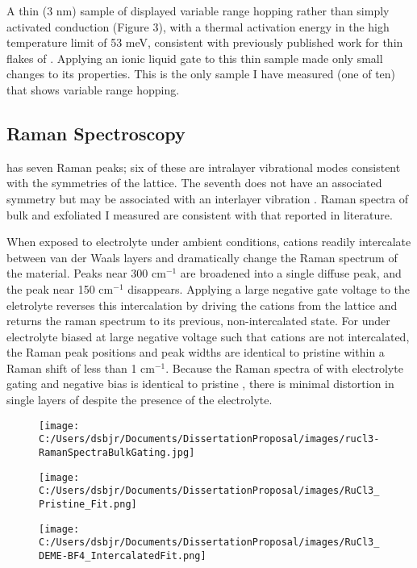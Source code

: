 \documentclass[11pt]{article}
\begin{document}
A thin (3 nm) sample of \rucl displayed variable range hopping rather than simply activated conduction (Figure 3), with a thermal activation energy in the high temperature limit of 53 meV, consistent with previously published work for thin flakes of \rucl \cite{Mashhadi2018}. Applying an ionic liquid gate to this thin sample made only small changes to its properties. This is the only sample I have measured (one of ten) that shows variable range hopping.

\subsection{Raman Spectroscopy}

\rucl has seven Raman peaks; six of these are intralayer vibrational modes consistent with the symmetries of the \rucl lattice. The seventh does not have an associated symmetry but may be associated with an interlayer vibration \cite{Zhou2018}. Raman spectra of bulk and exfoliated \rucl I measured are consistent with that reported in literature.

When exposed to electrolyte under ambient conditions, cations readily intercalate between van der Waals layers and dramatically change the Raman spectrum of the material. Peaks near 300 cm$^{-1}$ are broadened into a single diffuse peak, and the peak near 150 cm$^{-1}$ disappears. Applying a large negative gate voltage to the eletrolyte reverses this intercalation by driving the cations from the lattice and returns the raman spectrum to its previous, non-intercalated state. For \rucl under electrolyte biased at large negative voltage such that cations are not intercalated, the Raman peak positions and peak widths are identical to pristine \rucl within a Raman shift of less than 1 cm$^{-1}$. Because the Raman spectra of \rucl with electrolyte gating and negative bias is identical to pristine \ruclnospace , there is minimal distortion in single layers of \rucl despite the presence of the electrolyte.

\begin{figure}
\centering 
  {\texttt{[image: C:/Users/dsbjr/Documents/DissertationProposal/images/rucl3-RamanSpectraBulkGating.jpg]}\label{fig:f5}}
  \captionsetup{width=0.5\textwidth}
\end{figure}
\begin{figure}
\centering
  {\texttt{[image: C:/Users/dsbjr/Documents/DissertationProposal/images/RuCl3\_Pristine\_Fit.png]}\label{fig:f6}}
  \captionsetup{width=0.5\textwidth}
\end{figure}
\begin{figure}
\centering
{\texttt{[image: C:/Users/dsbjr/Documents/DissertationProposal/images/RuCl3\_DEME-BF4\_IntercalatedFit.png]}\label{fig:f6}}
\captionsetup{width=0.5\textwidth}
\end{figure}
\end{document}
